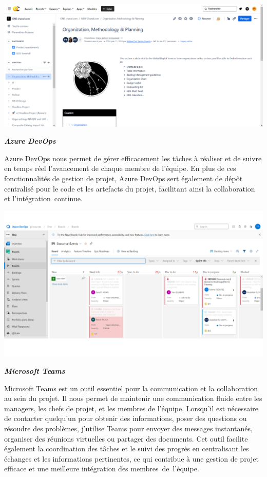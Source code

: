 \begin{center}
    \centering
    \includegraphics[width=19cm]{Figures/Confluence Documentation.png}
\end{center}


\textbf{\textbullet \textit{Azure DevOps}}

Azure DevOps nous permet de gérer efficacement les tâches à réaliser et de suivre en temps réel l'avancement de chaque membre de l'équipe. En plus de ces fonctionnalités de gestion de projet, Azure DevOps sert également de dépôt centralisé pour le code et les artefacts du projet, facilitant ainsi la collaboration et l'intégration continue.
\begin{center}
    \centering
    \includegraphics[width=18cm]{Figures/azure DevOps-tickets.png}
\end{center}

\textbf{\textbullet \textit{Microsoft Teams}}

Microsoft Teams est un outil essentiel pour la communication et la collaboration au sein du projet. Il nous permet de maintenir une communication fluide entre les managers, les chefs de projet, et les membres de l'équipe. Lorsqu'il est nécessaire de contacter quelqu'un pour obtenir des informations, poser des questions ou résoudre des problèmes, j'utilise Teams pour envoyer des messages instantanés, organiser des réunions virtuelles ou partager des documents. Cet outil facilite également la coordination des tâches et le suivi des progrès en centralisant les échanges et les informations pertinentes, ce qui contribue à une gestion de projet efficace et une meilleure intégration des membres de l'équipe.


